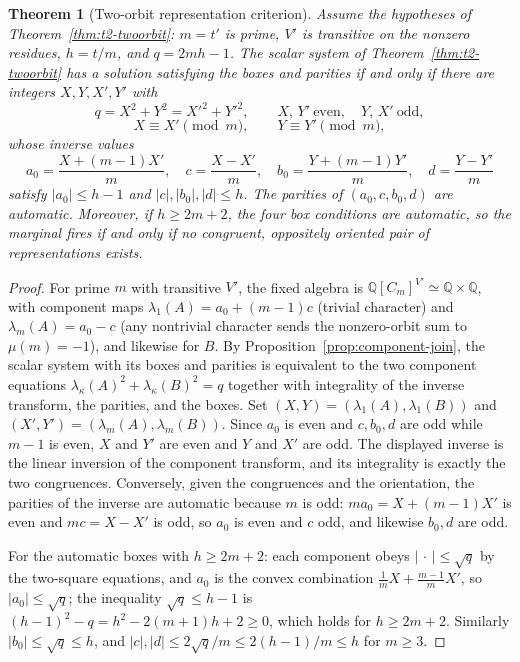 \documentclass[11pt]{article}
\theoremstyle{plain}
\newtheorem{theorem}{Theorem}[section]
\theoremstyle{definition}
\theoremstyle{remark}
\newcommand{\Q}{\mathbb Q}
\begin{document}
\begin{theorem}[Two-orbit representation criterion]\label{thm:two-orbit-reps}
Assume the hypotheses of Theorem~\ref{thm:t2-twoorbit}: $m=t'$ is prime,
$V'$ is transitive on the nonzero residues, $h=t/m$, and $q=2mh-1$.  The
scalar system of Theorem~\ref{thm:t2-twoorbit} has a solution satisfying the
boxes and parities if and only if there are integers $X,Y,X',Y'$ with
\[
  q=X^2+Y^2=X'^2+Y'^2,\qquad
  X,\,Y'\ \text{even},\quad Y,\,X'\ \text{odd},
\]
\[
  X\equiv X'\pmod m,\qquad Y\equiv Y'\pmod m,
\]
whose inverse values
\[
  a_0=\frac{X+(m-1)X'}{m},\quad
  c=\frac{X-X'}{m},\quad
  b_0=\frac{Y+(m-1)Y'}{m},\quad
  d=\frac{Y-Y'}{m}
\]
satisfy $|a_0|\le h-1$ and $|c|,|b_0|,|d|\le h$.  The parities of
$(a_0,c,b_0,d)$ are automatic.  Moreover, if $h\ge2m+2$, the four box
conditions are automatic, so the marginal fires if and only if no congruent,
oppositely oriented pair of representations exists.
\end{theorem}

\begin{proof}
For prime $m$ with transitive $V'$, the fixed algebra is
$\Q[C_m]^{V'}\simeq\Q\times\Q$, with component maps
$\lambda_1(A)=a_0+(m-1)c$ (trivial character) and
$\lambda_m(A)=a_0-c$ (any nontrivial character sends the nonzero-orbit sum
to $\mu(m)=-1$), and likewise for $B$.  By
Proposition~\ref{prop:component-join}, the scalar system with its boxes and
parities is equivalent to the two component equations
$\lambda_\kappa(A)^2+\lambda_\kappa(B)^2=q$ together with integrality of the
inverse transform, the parities, and the boxes.  Set
$(X,Y)=(\lambda_1(A),\lambda_1(B))$ and
$(X',Y')=(\lambda_m(A),\lambda_m(B))$.  Since $a_0$ is even and $c,b_0,d$
are odd while $m-1$ is even, $X$ and $Y'$ are even and $Y$ and $X'$ are odd.
The displayed inverse is the linear inversion of the component transform,
and its integrality is exactly the two congruences.  Conversely, given the
congruences and the orientation, the parities of the inverse are automatic
because $m$ is odd: $ma_0=X+(m-1)X'$ is even and $mc=X-X'$ is odd, so $a_0$
is even and $c$ odd, and likewise $b_0,d$ are odd.

For the automatic boxes with $h\ge2m+2$: each component obeys
$|\,\cdot\,|\le\sqrt q$ by the two-square equations, and $a_0$ is the convex
combination $\frac1mX+\frac{m-1}mX'$, so $|a_0|\le\sqrt q$; the inequality
$\sqrt q\le h-1$ is $(h-1)^2-q=h^2-2(m+1)h+2\ge0$, which holds for
$h\ge2m+2$.  Similarly $|b_0|\le\sqrt q\le h$, and
$|c|,|d|\le2\sqrt q/m\le2(h-1)/m\le h$ for $m\ge3$.
\end{proof}
\end{document}
